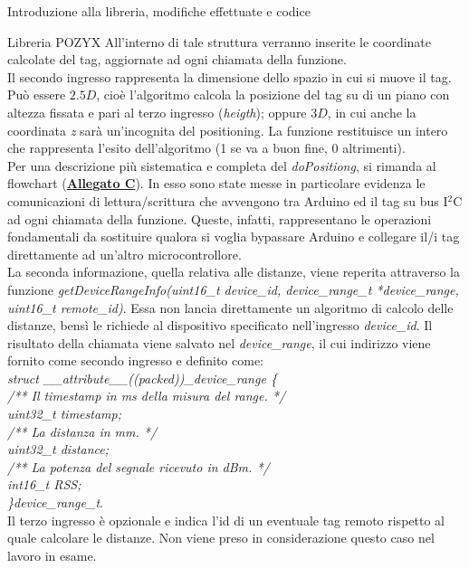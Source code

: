 \documentclass[12pt]{report}
\begin{document}
\begin{section}{Introduzione alla libreria, modifiche effettuate e codice}
\begin{subsection}{Libreria POZYX}
			All’interno di tale struttura verranno inserite le coordinate calcolate del tag, aggiornate ad ogni chiamata della funzione.\\
			Il secondo ingresso rappresenta la dimensione dello spazio in cui si muove il tag. Può essere $2.5D$, cioè l’algoritmo calcola la posizione del tag su di un piano con altezza  fissata e pari al terzo ingresso (\textit{heigth}); oppure $3D$, in cui anche la coordinata \textit{z} sarà un'incognita del positioning. La 						funzione restituisce un intero che rappresenta l'esito dell’algoritmo (1 se va a buon fine, 0 altrimenti).\\ 
			Per una descrizione più sistematica e completa del \textit{doPositiong}, si rimanda al flowchart (\hyperlink{A3}{\textbf{Allegato C}}). In esso sono state messe in particolare evidenza le comunicazioni di lettura/scrittura che avvengono tra Arduino ed il tag su bus I$^2$C ad ogni chiamata della funzione. 							Queste, infatti, rappresentano le operazioni fondamentali da sostituire qualora si voglia bypassare Arduino e collegare il/i tag direttamente ad un’altro microcontrollore.\\
			La seconda informazione, quella relativa alle distanze, viene reperita attraverso la funzione \textit{getDeviceRangeInfo(uint16\_t device\_id, device\_range\_t *device\_range, uint16\_t remote\_id)}. Essa non lancia direttamente un algoritmo di calcolo delle distanze, bensì le richiede al dispositivo specificato 					nell'ingresso \textit{device\_id}. Il risultato della chiamata viene salvato nel \textit{device\_range}, il cui indirizzo viene fornito come secondo ingresso e definito come: \\
			\textit{struct \_\_attribute\_\_((packed))\_device\_range \{\\
    		/**  Il timestamp in ms della misura del range. */\\
    		uint32\_t timestamp;\\
    		/** La distanza in mm. */\\
    		uint32\_t distance;\\
    		/** La potenza del segnale ricevuto in dBm. */\\
   			int16\_t RSS;\\
			\}device\_range\_t}.\\ 
			Il terzo ingresso è opzionale e indica l'id di un eventuale tag remoto rispetto al quale calcolare le distanze.  Non viene preso in considerazione questo caso nel lavoro in esame.

		\end{subsection}


\end{section}
\end{document}

